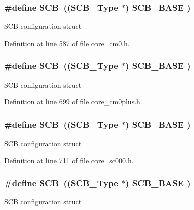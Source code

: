 \subsubsection[{\texorpdfstring{S\+CB}{SCB}}]{\setlength{\rightskip}{0pt plus 5cm}\#define S\+CB~(({\bf S\+C\+B\+\_\+\+Type}       $\ast$)     {\bf S\+C\+B\+\_\+\+B\+A\+SE}      )}\hypertarget{group___c_m_s_i_s__core__base_gaaaf6477c2bde2f00f99e3c2fd1060b01}{}\label{group___c_m_s_i_s__core__base_gaaaf6477c2bde2f00f99e3c2fd1060b01}
S\+CB configuration struct 

Definition at line 587 of file core\+\_\+cm0.\+h.

\subsubsection[{\texorpdfstring{S\+CB}{SCB}}]{\setlength{\rightskip}{0pt plus 5cm}\#define S\+CB~(({\bf S\+C\+B\+\_\+\+Type}       $\ast$)     {\bf S\+C\+B\+\_\+\+B\+A\+SE}      )}\hypertarget{group___c_m_s_i_s__core__base_gaaaf6477c2bde2f00f99e3c2fd1060b01}{}\label{group___c_m_s_i_s__core__base_gaaaf6477c2bde2f00f99e3c2fd1060b01}
S\+CB configuration struct 

Definition at line 699 of file core\+\_\+cm0plus.\+h.

\subsubsection[{\texorpdfstring{S\+CB}{SCB}}]{\setlength{\rightskip}{0pt plus 5cm}\#define S\+CB~(({\bf S\+C\+B\+\_\+\+Type}       $\ast$)     {\bf S\+C\+B\+\_\+\+B\+A\+SE}      )}\hypertarget{group___c_m_s_i_s__core__base_gaaaf6477c2bde2f00f99e3c2fd1060b01}{}\label{group___c_m_s_i_s__core__base_gaaaf6477c2bde2f00f99e3c2fd1060b01}
S\+CB configuration struct 

Definition at line 711 of file core\+\_\+sc000.\+h.

\subsubsection[{\texorpdfstring{S\+CB}{SCB}}]{\setlength{\rightskip}{0pt plus 5cm}\#define S\+CB~(({\bf S\+C\+B\+\_\+\+Type}       $\ast$)     {\bf S\+C\+B\+\_\+\+B\+A\+SE}      )}\hypertarget{group___c_m_s_i_s__core__base_gaaaf6477c2bde2f00f99e3c2fd1060b01}{}\label{group___c_m_s_i_s__core__base_gaaaf6477c2bde2f00f99e3c2fd1060b01}
S\+CB configuration struct 

